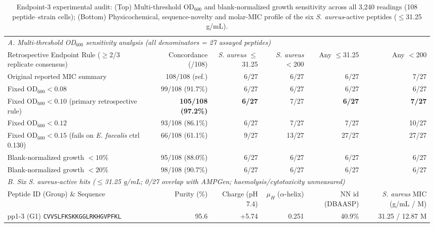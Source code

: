 \documentclass[unnumsec,webpdf,contemporary,large]{oup-authoring-template}
\newcommand{\rev}[1]{#1}
\begin{document}
\begin{table}[t]
\caption{\rev{Endpoint-3 experimental audit: (Top) Multi-threshold OD$_{600}$ and blank-normalized growth sensitivity across all 3,240 readings (108 peptide--strain cells); (Bottom) Physicochemical, sequence-novelty and molar-MIC profile of the six \textit{S. aureus}-active peptides ($\leq$31.25 \textmu{}g/mL).}}
\label{tab:wetlab_summary}
\centering
\footnotesize
\begin{tabular}{lrrrrr}
\toprule
\multicolumn{6}{l}{\textit{\rev{A. Multi-threshold OD$_{600}$ sensitivity analysis (all denominators = 27 assayed peptides)}}} \\
\rev{Retrospective Endpoint Rule ($\geq$2/3 replicate consensus)} & \rev{Concordance (/108)} & \rev{\textit{S. aureus} $\leq$31.25} & \rev{\textit{S. aureus} $<$200} & \rev{Any $\leq$31.25} & \rev{Any $<$200} \\
\midrule
Original reported MIC summary & 108/108 (ref.) & 6/27 & 6/27 & 6/27 & 7/27 \\
\rev{Fixed OD$_{600}<0.08$} & \rev{99/108 (91.7\%)} & \rev{6/27} & \rev{6/27} & \rev{6/27} & \rev{6/27} \\
\rev{Fixed OD$_{600}<0.10$ (primary retrospective rule)} & \rev{\textbf{105/108 (97.2\%)}} & \rev{\textbf{6/27}} & \rev{7/27} & \rev{\textbf{6/27}} & \rev{\textbf{7/27}} \\
\rev{Fixed OD$_{600}<0.12$} & \rev{93/108 (86.1\%)} & \rev{6/27} & \rev{7/27} & \rev{7/27} & \rev{10/27} \\
\rev{Fixed OD$_{600}<0.15$ (fails on \textit{E. faecalis} ctrl 0.130)} & \rev{66/108 (61.1\%)} & \rev{9/27} & \rev{13/27} & \rev{27/27} & \rev{27/27} \\
\rev{Blank-normalized growth $<10\%$} & \rev{95/108 (88.0\%)} & \rev{6/27} & \rev{6/27} & \rev{6/27} & \rev{6/27} \\
\rev{Blank-normalized growth $<20\%$} & \rev{98/108 (90.7\%)} & \rev{6/27} & \rev{6/27} & \rev{6/27} & \rev{6/27} \\
\midrule
\multicolumn{6}{l}{\textit{\rev{B. Six \textit{S. aureus}-active hits ($\leq$31.25 \textmu{}g/mL; 0/27 overlap with AMPGen; haemolysis/cytotoxicity unmeasured)}}} \\
\rev{Peptide ID (Group) \& Sequence} & \rev{Purity (\%)} & \rev{Charge (pH 7.4)} & \rev{$\mu_H$ ($\alpha$-helix)} & \rev{NN id (DBAASP)} & \rev{\textit{S. aureus} MIC (\textmu{}g/mL / \textmu{}M)} \\
\midrule
\rev{pp1-3 (G1) \texttt{CVVSLFKSKKGGLRKHGVPFKL}} & \rev{95.6} & \rev{+5.74} & \rev{0.251} & \rev{40.9\%} & \rev{31.25 / 12.87 \textmu{}M} \\

\end{tabular}
\end{table}
\end{document}
